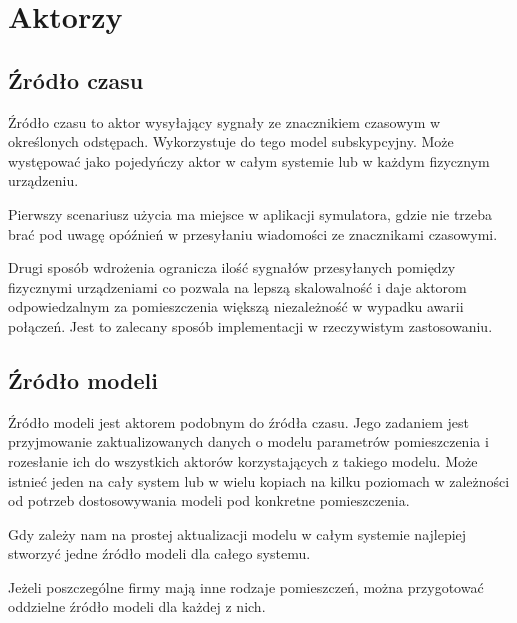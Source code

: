\chapter{Aktorzy}\label{ch:aktorzy}

\section{Źródło czasu}
Źródło czasu to aktor wysyłający sygnały ze znacznikiem czasowym w określonych odstępach. Wykorzystuje do tego model subskypcyjny. Może występować jako pojedyńczy aktor w całym systemie lub w każdym fizycznym urządzeniu. 



Pierwszy scenariusz użycia ma miejsce w aplikacji symulatora, gdzie nie trzeba brać pod uwagę opóźnień w przesyłaniu wiadomości ze znacznikami czasowymi. 



Drugi sposób wdrożenia ogranicza ilość sygnałów przesyłanych pomiędzy fizycznymi urządzeniami co pozwala na lepszą skalowalność i daje aktorom odpowiedzalnym za pomieszczenia większą niezależność w wypadku awarii połączeń. 
Jest to zalecany sposób implementacji w rzeczywistym zastosowaniu.

\section{Źródło modeli}
Źródło modeli jest aktorem podobnym do źródła czasu. 
Jego zadaniem jest przyjmowanie zaktualizowanych danych o modelu parametrów pomieszczenia i rozesłanie ich do wszystkich aktorów korzystających z takiego modelu.
Może istnieć jeden na cały system lub w wielu kopiach na kilku poziomach w zależności od potrzeb dostosowywania modeli pod konkretne pomieszczenia.



Gdy zależy nam na prostej aktualizacji modelu w całym systemie najlepiej stworzyć jedne źródło modeli dla całego systemu. 



Jeżeli poszczególne firmy mają inne rodzaje pomieszczeń, można przygotować oddzielne źródło modeli dla każdej z nich. 



